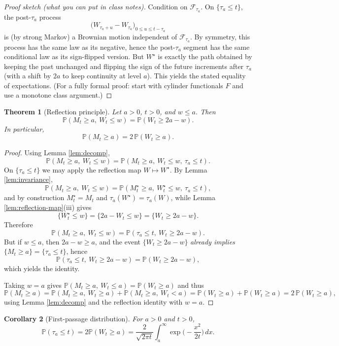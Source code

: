 \documentclass[11pt]{article}
\newtheorem{theorem}{Theorem}[section]
\newtheorem{corollary}[theorem]{Corollary}
\theoremstyle{definition}
\theoremstyle{remark}
\newcommand{\Pbb}{\mathbb{P}}
\newcommand{\cF}{\mathcal{F}}
\begin{document}
\begin{proof}[Proof sketch (what you can put in class notes)]
Condition on $\cF_{\tau_a}$. On $\{\tau_a\le t\}$, the post-$\tau_a$ process
\[
\big(W_{\tau_a+u}-W_{\tau_a}\big)_{0\le u\le t-\tau_a}
\]
is (by strong Markov) a Brownian motion independent of $\cF_{\tau_a}$.
By symmetry, this process has the same law as its negative, hence the post-$\tau_a$ segment
has the same conditional law as its sign-flipped version.
But $W^\star$ is exactly the path obtained by keeping the past unchanged and flipping the sign
of the future increments after $\tau_a$ (with a shift by $2a$ to keep continuity at level $a$).
This yields the stated equality of expectations.
(For a fully formal proof: start with cylinder functionals $F$ and use a monotone class argument.)
\end{proof}

\begin{theorem}[Reflection principle]\label{thm:reflection}
Let $a>0$, $t>0$, and $w\le a$. Then
\[
\Pbb(M_t\ge a,\ W_t\le w)=\Pbb(W_t\ge 2a-w).
\]
In particular,
\[
\Pbb(M_t\ge a)=2\,\Pbb(W_t\ge a).
\]
\end{theorem}

\begin{proof}
Using Lemma \ref{lem:decomp},
\[
\Pbb(M_t\ge a,\ W_t\le w)
=
\Pbb(M_t\ge a,\ W_t\le w,\ \tau_a\le t).
\]
On $\{\tau_a\le t\}$ we may apply the reflection map $W\mapsto W^\star$.
By Lemma \ref{lem:invariance},
\[
\Pbb(M_t\ge a,\ W_t\le w)
=
\Pbb(M_t^\star\ge a,\ W_t^\star\le w,\ \tau_a\le t),
\]
and by construction $M_t^\star=M_t$ and $\tau_a(W^\star)=\tau_a(W)$, while Lemma \ref{lem:reflection-map}(iii) gives
\[
\{W_t^\star\le w\}=\{2a-W_t\le w\}=\{W_t\ge 2a-w\}.
\]
Therefore
\[
\Pbb(M_t\ge a,\ W_t\le w)=\Pbb(\tau_a\le t,\ W_t\ge 2a-w).
\]
But if $w\le a$, then $2a-w\ge a$, and the event $\{W_t\ge 2a-w\}$ \emph{already implies} $\{M_t\ge a\}=\{\tau_a\le t\}$,
hence
\[
\Pbb(\tau_a\le t,\ W_t\ge 2a-w)=\Pbb(W_t\ge 2a-w),
\]
which yields the identity.

Taking $w=a$ gives $\Pbb(M_t\ge a,\ W_t\le a)=\Pbb(W_t\ge a)$ and thus
\[
\Pbb(M_t\ge a)
=
\Pbb(M_t\ge a,\ W_t\ge a)+\Pbb(M_t\ge a,\ W_t<a)
=
\Pbb(W_t\ge a)+\Pbb(W_t\ge a)
=
2\,\Pbb(W_t\ge a),
\]
using Lemma \ref{lem:decomp} and the reflection identity with $w=a$.
\end{proof}

\begin{corollary}[First-passage distribution]\label{cor:firstpass}
For $a>0$ and $t>0$,
\[
\Pbb(\tau_a\le t)=2\Pbb(W_t\ge a)
=
\frac{2}{\sqrt{2\pi t}}\int_a^\infty \exp\!\Big(-\frac{x^2}{2t}\Big)\,dx.
\]
\end{corollary}
\end{document}

